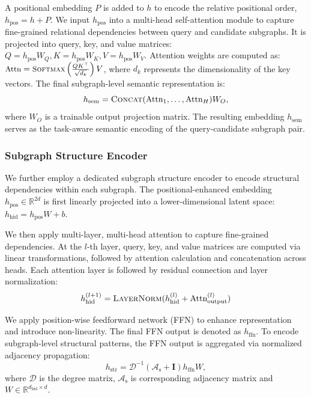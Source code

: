 \documentclass[letterpaper]{article} %
\begin{document}
A positional embedding ${P}$ is added to ${h}$ to encode the relative positional order, ${h}_{\text{pos}} = {h} + {P}$. We input ${h}_{\text{pos}}$ into a multi-head self-attention module to capture fine-grained relational dependencies between query and candidate subgraphs. It is projected into query, key, and value matrices: ${Q}={h}_{\text{pos}}{W}_Q, {K}={h}_{\text{pos}}{W}_K,{V}={h}_{\text{pos}}{W}_V$. Attention weights are computed as: $\small\text{Attn} = \textsc{Softmax}\left(\frac{{Q} {K}^\top}{\sqrt{d_k}}\right){V}$, where $d_k$ represents the dimensionality of the key vectors. The final subgraph-level semantic representation is:
\begin{equation}
\label{eq:sem_concat}
{h}_{\text{sem}} = \textsc{Concat}(\text{Attn}_1, \dots, \text{Attn}_H) {W}_O,
\end{equation}
where ${W}_O$ is a trainable output projection matrix. The resulting embedding ${h}_{\text{sem}}$ serves as the task-aware semantic encoding of the query-candidate subgraph pair.

\subsubsection{Subgraph Structure Encoder}
We further employ a dedicated {subgraph structure encoder} to encode structural dependencies within each subgraph. The positional-enhanced embedding ${h}_{\text{pos}} \in \mathbb{R}^{2d}$ is first linearly projected into a lower-dimensional latent space: 
${h}_{\text{hid}} = {h}_{\text{pos}} {W} + {b}$. 

We then apply multi-layer, multi-head attention to capture fine-grained dependencies. At the $l$-th layer, query, key, and value matrices are computed via linear transformations, followed by attention calculation and concatenation across heads. Each attention layer is followed by residual connection and layer normalization: 
\begin{equation}
    {h}_{\text{hid}}^{(l+1)} = \textsc{LayerNorm}({h}_{\text{hid}}^{(l)} + \text{Attn}^{(l)}_{\text{output}})
\end{equation}

We apply position-wise feedforward network (FFN) to enhance representation and introduce non-linearity. The final FFN output is denoted as ${h}_{\text{ffn}}$. To encode subgraph-level structural patterns, the FFN output is aggregated via normalized adjacency propagation:
\begin{equation}
\label{eq:str_adj_pro}
{h}_{\text{str}} = \mathcal{D}^{-1} (\mathcal{A}_{\text{s}} + \mathbf{I}) {h}_{\text{ffn}} {W},
\end{equation}
where ${\mathcal{D}}$ is the degree matrix, $\mathcal{A}_{\text{s}}$ is corresponding adjacency matrix and ${W} \in \mathbb{R}^{d_{\text{hid}} \times d}$. 
\end{document}
